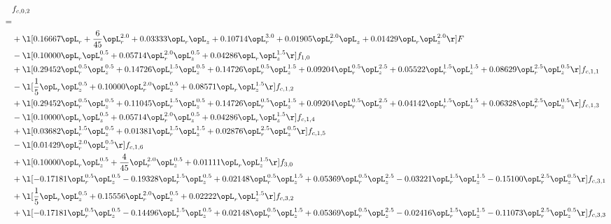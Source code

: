 \begin{alignat}{2} 
\label{eq:f_02_1} 
& f_{c,0,2} \nonumber \\ 
 = \\ 
& + \l[  0.16667 \opL_r + \frac{6}{45} \opL_r^{2.0} +  0.03333 \opL_r \opL_z +  0.10714 \opL_r^{3.0} +  0.01905 \opL_r^{2.0} \opL_z +  0.01429 \opL_r \opL_z^{2.0}  \r] F \nonumber \\ 
& - \l[  0.10000 \opL_r \opL_z^{0.5} +  0.05714 \opL_r^{2.0} \opL_z^{0.5} +  0.04286 \opL_r \opL_z^{1.5}  \r] f_{1,0} \nonumber \\ 
& + \l[  0.29452 \opL_r^{0.5} \opL_z^{0.5} +  0.14726 \opL_r^{1.5} \opL_z^{0.5} +  0.14726 \opL_r^{0.5} \opL_z^{1.5} +  0.09204 \opL_r^{0.5} \opL_z^{2.5} +  0.05522 \opL_r^{1.5} \opL_z^{1.5} +  0.08629 \opL_r^{2.5} \opL_z^{0.5}  \r] f_{c,1,1} \nonumber \\ 
& - \l[ \frac{1}{5} \opL_r \opL_z^{0.5} +  0.10000 \opL_r^{2.0} \opL_z^{0.5} +  0.08571 \opL_r \opL_z^{1.5}  \r] f_{c,1,2} \nonumber \\ 
& + \l[  0.29452 \opL_r^{0.5} \opL_z^{0.5} +  0.11045 \opL_r^{1.5} \opL_z^{0.5} +  0.14726 \opL_r^{0.5} \opL_z^{1.5} +  0.09204 \opL_r^{0.5} \opL_z^{2.5} +  0.04142 \opL_r^{1.5} \opL_z^{1.5} +  0.06328 \opL_r^{2.5} \opL_z^{0.5}  \r] f_{c,1,3} \nonumber \\ 
& - \l[  0.10000 \opL_r \opL_z^{0.5} +  0.05714 \opL_r^{2.0} \opL_z^{0.5} +  0.04286 \opL_r \opL_z^{1.5}  \r] f_{c,1,4} \nonumber \\ 
& + \l[  0.03682 \opL_r^{1.5} \opL_z^{0.5} +  0.01381 \opL_r^{1.5} \opL_z^{1.5} +  0.02876 \opL_r^{2.5} \opL_z^{0.5}  \r] f_{c,1,5} \nonumber \\ 
& - \l[  0.01429 \opL_r^{2.0} \opL_z^{0.5}  \r] f_{c,1,6} \nonumber \\ 
& + \l[  0.10000 \opL_r \opL_z^{0.5} + \frac{4}{45} \opL_r^{2.0} \opL_z^{0.5} +  0.01111 \opL_r \opL_z^{1.5}  \r] f_{3,0} \nonumber \\ 
& + \l[  -0.17181 \opL_r^{0.5} \opL_z^{0.5}   -0.19328 \opL_r^{1.5} \opL_z^{0.5} +  0.02148 \opL_r^{0.5} \opL_z^{1.5} +  0.05369 \opL_r^{0.5} \opL_z^{2.5}   -0.03221 \opL_r^{1.5} \opL_z^{1.5}   -0.15100 \opL_r^{2.5} \opL_z^{0.5}  \r] f_{c,3,1} \nonumber \\ 
& + \l[ \frac{1}{5} \opL_r \opL_z^{0.5} +  0.15556 \opL_r^{2.0} \opL_z^{0.5} +  0.02222 \opL_r \opL_z^{1.5}  \r] f_{c,3,2} \nonumber \\ 
& + \l[  -0.17181 \opL_r^{0.5} \opL_z^{0.5}   -0.14496 \opL_r^{1.5} \opL_z^{0.5} +  0.02148 \opL_r^{0.5} \opL_z^{1.5} +  0.05369 \opL_r^{0.5} \opL_z^{2.5}   -0.02416 \opL_r^{1.5} \opL_z^{1.5}   -0.11073 \opL_r^{2.5} \opL_z^{0.5}  \r] f_{c,3,3} \nonumber \\ 

\end{alignat}
